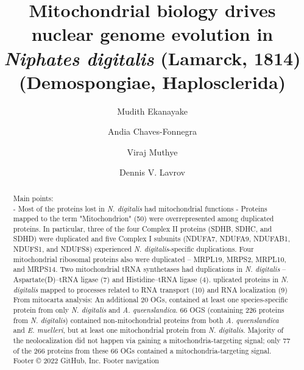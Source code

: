 
\title{Mitochondrial biology drives nuclear genome evolution in \textit{Niphates digitalis} (Lamarck, 1814) (Demospongiae, Haplosclerida)}

\author[1]{Mudith Ekanayake }
\author[2]{Andia Chaves-Fonnegra }
\author[1]{Viraj Muthye }
\author[1,\Letter]{Dennis V. Lavrov }
\date{}

\maketitle

\begin{abstract}
Main points: \\- Most of the proteins lost in \textit{N. digitalis} had mitochondrial functions
- Proteins  mapped to the term "Mitochondrion" (50) were overrepresented among duplicated proteins.
In particular, three of the four Complex II proteins (SDHB, SDHC, and SDHD) were duplicated and five Complex I subunits (NDUFA7, NDUFA9, NDUFAB1, NDUFS1, and NDUFS8) experienced \textit{N. digitalis}-specific duplications.
Four mitochondrial ribosomal proteins also were duplicated -- MRPL19, MRPS2, MRPL10, and MRPS14.
Two mitochondrial tRNA synthetases had duplications in \textit{N. digitalis} -- Aspartate(D)--tRNA ligase (7) and Histidine--tRNA ligase (4).
uplicated proteins in \textit{N. digitalis} mapped to processes related to RNA transport (10) and RNA localization (9)
From mitocarta analysis: An additional 20 OGs, contained at least one species-specific protein from only \textit{N. digitalis} and \textit{A. queenslandica}.
66 OGS (containing 226 proteins from \textit{N. digitalis}) contained non-mitochondrial proteins from both \textit{A. queenslandica} and \textit{E. muelleri}, but at least one mitochondrial protein from  \textit{N. digitalis}.
Majority of the neolocalization did not happen via gaining a mitochondria-targeting signal; only 77 of the 266 proteins from these 66 OGs contained a mitochondria-targeting signal.\\
Footer
© 2022 GitHub, Inc.
Footer navigation
\lipsum[1]
\end{abstract}

